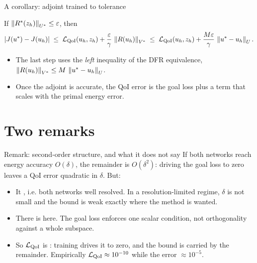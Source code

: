 \documentclass[11pt,aspectratio=169]{beamer}
\begin{document}
\begin{frame}{A corollary: adjoint trained to tolerance}
  \begin{corollary}
    If $\left\|R^{*}(z_h)\right\|_{U^*} \le \varepsilon$, then
    \[
      |J(u^*) - J(u_h)|
        \;\le\; \mathcal{L}_{\mathrm{QoI}}(u_h, z_h) + \frac{\varepsilon}{\gamma}\,\left\|R(u_h)\right\|_{V^*}
        \;\le\; \mathcal{L}_{\mathrm{QoI}}(u_h, z_h) + \frac{M\varepsilon}{\gamma}\,\left\|u^* - u_h\right\|_U .
    \]
  \end{corollary}
  \medskip
  \begin{itemize}\itemsep0.4em
    \item The last step uses the \emph{left} inequality of the DFR equivalence,
          $\left\|R(u_h)\right\|_{V^*} \le M\,\left\|u^*-u_h\right\|_U$.
    \item Once the adjoint is accurate, the QoI error is the goal loss plus a
          term that scales with the primal energy error.
  \end{itemize}
\end{frame}

\section{Two remarks}

\begin{frame}{Remark: second-order structure, and what it does not say}
  If both networks reach energy accuracy $O(\delta)$, the remainder is
  $O(\delta^2)$: driving the goal loss to zero leaves a QoI error quadratic in
  $\delta$. But:
  \medskip
  \begin{itemize}\itemsep0.45em
    \item[\alert{1.}] It , i.e. both networks
          well resolved. In a resolution-limited regime, $\delta$ is not small and
          the bound is weak exactly where the method is wanted.
    \item[\alert{2.}] There is  here. The goal
          loss enforces one scalar condition, not orthogonality against a whole
          subspace.
    \item[\alert{3.}] So $\mathcal{L}_{\mathrm{QoI}}$ is : training drives it
          to zero, and the bound is carried by the remainder. Empirically $\mathcal{L}_{\mathrm{QoI}}
          \approx 10^{-10}$ while the error $\approx 10^{-5}$.
  \end{itemize}
\end{frame}
\end{document}
